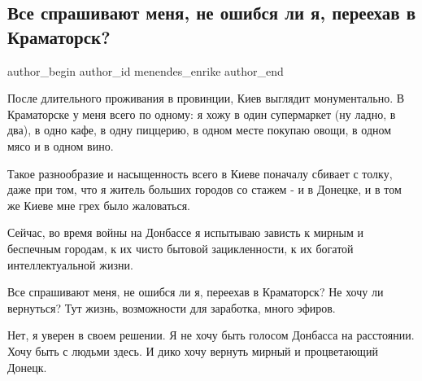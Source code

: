  
 
 
 
 
 
\subsection{Все спрашивают меня, не ошибся ли я, переехав в Краматорск?}
\label{sec:18_12_2021.fb.menendes_enrike.1.kramatorsk_kiev}
 
\ifcmt
 author_begin
   author_id menendes_enrike
 author_end
\fi

После длительного проживания в провинции, Киев выглядит монументально. В
Краматорске у меня всего по одному: я хожу в один супермаркет (ну ладно, в
два), в одно кафе, в одну пиццерию, в одном месте покупаю овощи, в одном мясо и
в одном вино. 

Такое разнообразие и насыщенность всего в Киеве поначалу сбивает с толку, даже
при том, что я житель больших городов со стажем - и в Донецке, и в том же Киеве
мне грех было жаловаться.

Сейчас, во время войны на Донбассе я испытываю зависть к мирным и беспечным
городам, к их чисто бытовой зацикленности, к их богатой интеллектуальной жизни.

Все спрашивают меня, не ошибся ли я, переехав в Краматорск? Не хочу ли
вернуться? Тут жизнь, возможности для заработка, много эфиров.

Нет, я уверен в своем решении. Я не хочу быть голосом Донбасса на расстоянии.
Хочу быть с людьми здесь. И дико хочу вернуть мирный и процветающий Донецк.

